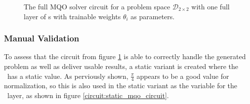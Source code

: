 \begin{figure}[!h]
    \centering
    \caption{The full MQO solver circuit for a problem space $\mathcal{D}_{2\times2}$ with one full layer of \rxgate s with trainable weights $\theta_i$ as parameters.}
    \label{circuit:full_trainable_mqp_circuit}
\end{figure}

\subsubsection{Manual Validation}
To assess that the circuit from figure \ref{circuit:full_trainable_mqp_circuit} is able to correctly handle the generated problem as well as deliver usable results, a static variant is created where the \rxgate\ has a static value. As perviously shown, $\frac{\pi}{4}$ appears to be a good value for normalization, so this is also used in the static variant as the variable for the \rxgate\ layer, as shown in figure \ref{circuit:static_mqo_circuit}.

